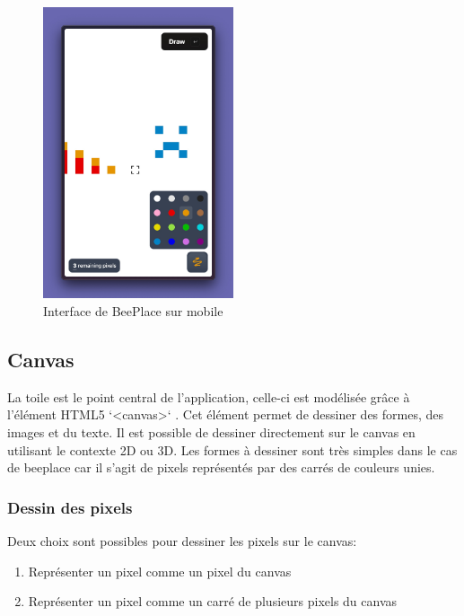 \begin{figure}[H]
  \centering
  \includegraphics[width=0.5\textwidth]{./assets/figures/screenshot-app-3.jpeg}
  \caption{Interface de BeePlace sur mobile}
  \label{fig:screenshot-app-3}
\end{figure}

\subsection{Canvas}

La toile est le point central de l'application, celle-ci est modélisée grâce à l'élément HTML5 `<canvas>` \cite{canvas}. Cet élément permet de dessiner des formes, des images et du texte. Il est possible de dessiner directement sur le canvas en utilisant le contexte 2D ou 3D. Les formes à dessiner sont très simples dans le cas de \gls{beeplace} car il s'agit de pixels représentés par des carrés de couleurs unies.

\subsubsection{Dessin des pixels}

Deux choix sont possibles pour dessiner les pixels sur le canvas:

\begin{enumerate}
  \item Représenter un pixel comme un pixel du canvas
  \item Représenter un pixel comme un carré de plusieurs pixels du canvas
\end{enumerate}

